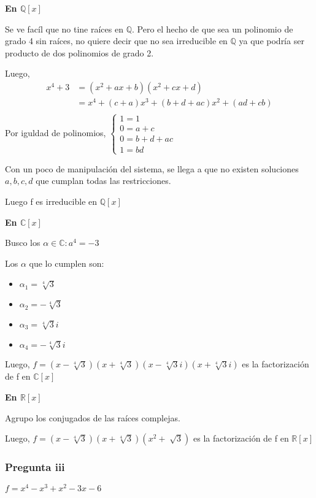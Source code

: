 \textbf{En $ \mathbb{Q}[x] $}

Se ve facíl que no tine raíces en $\mathbb{Q}$. Pero el hecho de que sea un polinomio de grado 4 sin raíces, no quiere decir que no
sea irreducible en $ \mathbb{Q} $ ya que podría ser producto de dos polinomios de grado 2.

Luego,
\begin{align*}
    x^4 + 3 &= (x^2 + ax + b)(x^2 + cx + d) \\
    &= x^4 + (c+a)x^3 + (b+d+ac)x^2 + (ad+cb) \\
\end{align*}
Por iguldad de polinomios, $ \begin{cases}
    1=1 \\
    0 = a+c \\
    0 = b+d+ac \\
    1 = bd
\end{cases} $

Con un poco de manipulación del sistema, se llega a que no existen soluciones $ a,b,c,d $ que cumplan todas las restricciones.

Luego f es irreducible en $ \mathbb{Q}[x] $

\textbf{En $ \mathbb{C}[x] $}

Busco los $ \alpha \in \mathbb{C}: a^4 = -3 $

Los $ \alpha $ que lo cumplen son:
\begin{itemize}
    \item $ \alpha_1 = \sqrt[4]{3} $
    \item $ \alpha_2 = -\sqrt[4]{3} $
    \item $ \alpha_3 = \sqrt[4]{3}i $
    \item $ \alpha_4 = -\sqrt[4]{3}i $
\end{itemize}
Luego, $ f = (x-\sqrt[4]{3})(x+\sqrt[4]{3})(x-\sqrt[4]{3}i)(x+\sqrt[4]{3}i) $ es la factorización de f en $ \mathbb{C}[x] $

\textbf{En $ \mathbb{R}[x] $}

Agrupo los conjugados de las raíces complejas.

Luego, $ f = (x-\sqrt[4]{3})(x+\sqrt[4]{3})(x^2 + \sqrt[]{3}) $ es la factorización de f en $ \mathbb{R}[x] $

\subsubsection{Pregunta iii}

$ f = x^4 - x^3 + x^2 - 3x - 6 $

